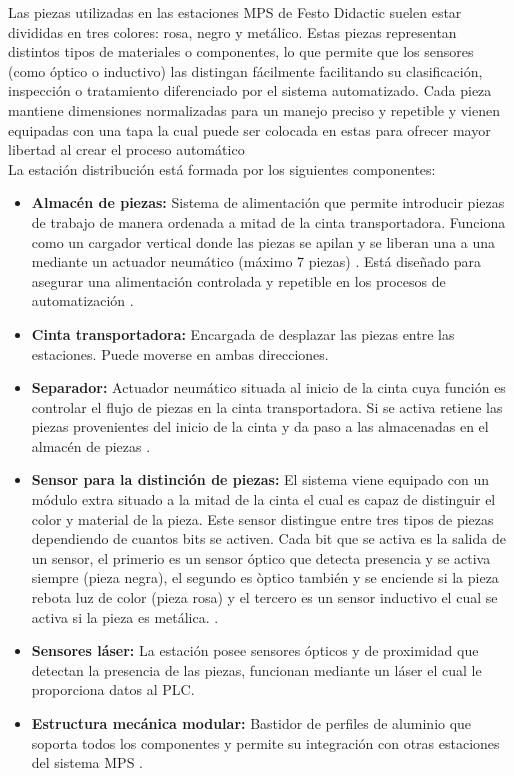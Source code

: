 Las piezas utilizadas en las estaciones MPS de Festo Didactic suelen estar divididas en tres colores: rosa, negro y metálico. Estas piezas representan distintos tipos de materiales o componentes, lo que permite que los sensores (como óptico o inductivo) las distingan fácilmente facilitando su clasificación, inspección o tratamiento diferenciado por el sistema automatizado. Cada pieza mantiene dimensiones normalizadas para un manejo preciso y repetible y vienen equipadas con una tapa la cual puede ser colocada en estas para ofrecer mayor libertad al crear el proceso automático \\

La estación distribución está formada por los siguientes componentes:

\begin{itemize}
   \item \textbf{Almacén de piezas:} Sistema de alimentación que permite introducir piezas de trabajo de manera ordenada a mitad de la cinta transportadora. Funciona como un cargador vertical donde las piezas se apilan y se liberan una a una mediante un actuador neumático (máximo 7 piezas) \cite{estacion_distribucion}. Está diseñado para asegurar una alimentación controlada y repetible en los procesos de automatización \cite{estacion_distribucion}.
   
    \item \textbf{Cinta transportadora:} Encargada de desplazar las piezas entre las estaciones. Puede moverse en ambas direcciones. 
    
     \item \textbf{Separador:} Actuador neumático situada al inicio de la cinta cuya función es controlar el flujo de piezas en la cinta transportadora. Si se activa retiene las piezas provenientes del inicio de la cinta y da paso a las almacenadas en el almacén de piezas \cite{estacion_distribucion}.
     
      \item \textbf{Sensor para la distinción de piezas:} El sistema viene equipado con un módulo extra situado a la mitad de la cinta el cual es capaz de distinguir el color y material de la pieza. Este sensor distingue entre tres tipos de piezas dependiendo de cuantos bits se activen. Cada bit que se activa es la salida de un sensor, el primerio es un sensor óptico que detecta presencia y se activa siempre (pieza negra), el segundo es òptico también y se enciende si la pieza rebota luz de color (pieza rosa) y el tercero es un sensor inductivo el cual se activa si la pieza es metálica. \cite{estacion_distribucion}.

    \item \textbf{Sensores láser:} La estación posee sensores ópticos y de proximidad que detectan la presencia de las piezas, funcionan mediante un láser el cual le proporciona datos al PLC.

    \item \textbf{Estructura mecánica modular:} Bastidor de perfiles de aluminio que soporta todos los componentes y permite su integración con otras estaciones del sistema MPS \cite{estacion_distribucion}.
\end{itemize}

